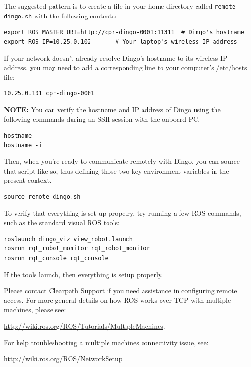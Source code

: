 \documentclass[]{clearpath-latex/clearpath-manual}
\begin{document}
The suggested pattern is to create a file in your home directory called \lstinline{remote-dingo.sh} with the following contents:

\begin{lstlisting}
export ROS_MASTER_URI=http://cpr-dingo-0001:11311  # Dingo's hostname
export ROS_IP=10.25.0.102       # Your laptop's wireless IP address
\end{lstlisting}

If your network doesn’t already resolve Dingo’s hostname to its wireless IP address, you may need to add a corresponding line to your computer’s /etc/hosts file:

\begin{lstlisting}
10.25.0.101 cpr-dingo-0001
\end{lstlisting}

\textbf{NOTE:} You can verify the hostname and IP address of Dingo using the following commands during an SSH session with the onboard PC.

\begin{lstlisting}
hostname
hostname -i
\end{lstlisting}

Then, when you’re ready to communicate remotely with Dingo, you can source that script like so, thus defining those two key environment variables in the present context.

\begin{lstlisting}
source remote-dingo.sh
\end{lstlisting}

To verify that everything is set up propelry, try running a few ROS commands, such as the standard visual ROS tools:

\begin{lstlisting}
roslaunch dingo_viz view_robot.launch
rosrun rqt_robot_monitor rqt_robot_monitor
rosrun rqt_console rqt_console
\end{lstlisting}

If the tools launch, then everything is setup properly.

Please contact Clearpath Support if you need assistance in configuring remote access. For more general details on how ROS works over TCP with multiple machines, please see:

\url{http://wiki.ros.org/ROS/Tutorials/MultipleMachines}.

For help troubleshooting a multiple machines connectivity issue, see:

\url{http://wiki.ros.org/ROS/NetworkSetup}
\end{document}
